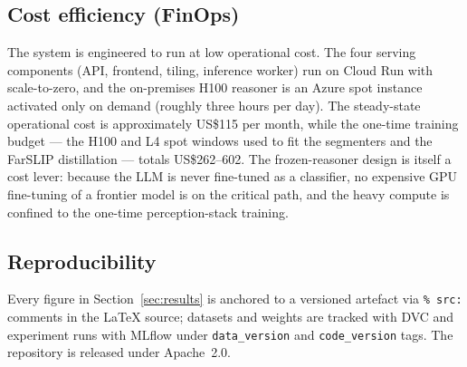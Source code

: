 \subsection{Cost efficiency (FinOps)}
The system is engineered to run at low operational cost. The four
serving components (API, frontend, tiling, inference worker) run on
Cloud Run with scale-to-zero, and the on-premises H100 reasoner is an
Azure spot instance activated only on demand (roughly three hours per
day). The steady-state operational cost is approximately
US\$115 per month, while the one-time training budget --- the H100 and
L4 spot windows used to fit the segmenters and the FarSLIP distillation
--- totals US\$262--602. The frozen-reasoner design is itself a cost
lever: because the LLM is never fine-tuned as a classifier, no
expensive GPU fine-tuning of a frontier model is on the critical path,
and the heavy compute is confined to the one-time perception-stack
training.

\subsection{Reproducibility}
Every figure in Section~\ref{sec:results} is anchored to a versioned
artefact via \texttt{\% src:} comments in the LaTeX source; datasets and
weights are tracked with DVC and experiment runs with MLflow under
\texttt{data\_version} and \texttt{code\_version} tags. The repository
is released under Apache~2.0.
